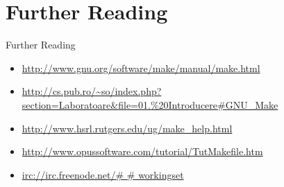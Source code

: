 \documentclass{beamer}
\begin{document}
\section{Further Reading}
    \frame{\tableofcontents[currentsection]}

    \begin{frame}{Further Reading}
    \begin{itemize}
    \setlength{\itemsep}{0.5cm}
    \footnotesize
    \item \url{http://www.gnu.org/software/make/manual/make.html}
    \item \url{http://cs.pub.ro/~so/index.php?section=Laboratoare\&file=01.\%20Introducere\#GNU\_Make}
    \item \url{http://www.hsrl.rutgers.edu/ug/make\_help.html}
    \item \url{http://www.opussoftware.com/tutorial/TutMakefile.htm}
    \item \url{irc://irc.freenode.net/\# \# workingset}
    \normalfont
    \end{itemize}
    \end{frame}
\end{document}
